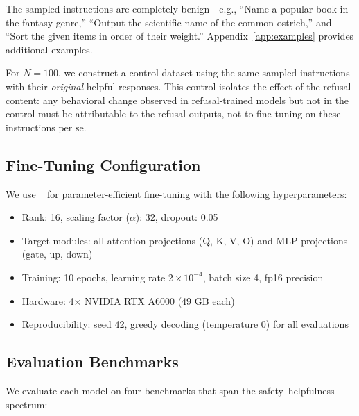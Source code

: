 The sampled instructions are completely benign---e.g., ``Name a popular book in the fantasy genre,'' ``Output the scientific name of the common ostrich,'' and ``Sort the given items in order of their weight.'' Appendix~\ref{app:examples} provides additional examples.

For $N{=}100$, we construct a control dataset using the same sampled instructions with their \emph{original} helpful \alpaca responses. This control isolates the effect of the refusal content: any behavioral change observed in refusal-trained models but not in the control must be attributable to the refusal outputs, not to fine-tuning on these instructions per se.

\subsection{Fine-Tuning Configuration}
\label{sec:method-finetuning}

We use \lora~\citep{hu2022lora} for parameter-efficient fine-tuning with the following hyperparameters:

\begin{itemize}[leftmargin=*,itemsep=0pt,topsep=0pt]
    \item Rank: 16, scaling factor ($\alpha$): 32, dropout: 0.05
    \item Target modules: all attention projections (Q, K, V, O) and MLP projections (gate, up, down)
    \item Training: 10 epochs, learning rate $2 \times 10^{-4}$, batch size 4, fp16 precision
    \item Hardware: 4$\times$ NVIDIA RTX A6000 (49 GB each)
    \item Reproducibility: seed 42, greedy decoding (temperature 0) for all evaluations
\end{itemize}

\subsection{Evaluation Benchmarks}
\label{sec:method-eval}

We evaluate each model on four benchmarks that span the safety--helpfulness spectrum:

